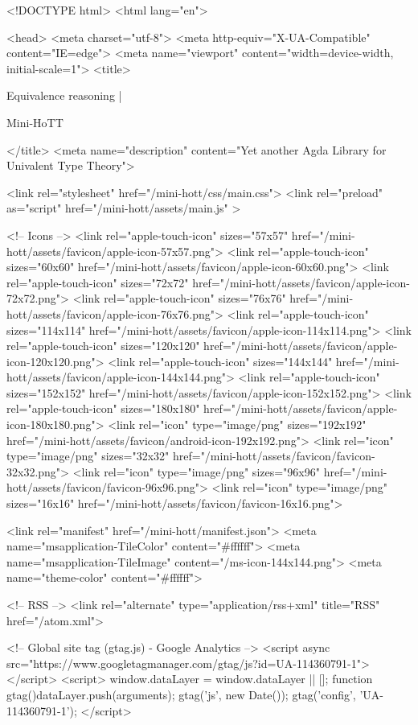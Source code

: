 <!DOCTYPE html>
<html lang="en">

<head>
  <meta charset="utf-8">
  <meta http-equiv="X-UA-Compatible" content="IE=edge">
  <meta name="viewport" content="width=device-width, initial-scale=1">
  <title>
    
      
        Equivalence reasoning |
      
        Mini-HoTT
    
  </title>
  <meta name="description" content="Yet another Agda Library for Univalent Type Theory">

  <link rel="stylesheet" href="/mini-hott/css/main.css">
  <link rel="preload" as="script" href="/mini-hott/assets/main.js" >

  <!-- Icons -->
  <link rel="apple-touch-icon" sizes="57x57" href="/mini-hott/assets/favicon/apple-icon-57x57.png">
  <link rel="apple-touch-icon" sizes="60x60" href="/mini-hott/assets/favicon/apple-icon-60x60.png">
  <link rel="apple-touch-icon" sizes="72x72" href="/mini-hott/assets/favicon/apple-icon-72x72.png">
  <link rel="apple-touch-icon" sizes="76x76" href="/mini-hott/assets/favicon/apple-icon-76x76.png">
  <link rel="apple-touch-icon" sizes="114x114" href="/mini-hott/assets/favicon/apple-icon-114x114.png">
  <link rel="apple-touch-icon" sizes="120x120" href="/mini-hott/assets/favicon/apple-icon-120x120.png">
  <link rel="apple-touch-icon" sizes="144x144" href="/mini-hott/assets/favicon/apple-icon-144x144.png">
  <link rel="apple-touch-icon" sizes="152x152" href="/mini-hott/assets/favicon/apple-icon-152x152.png">
  <link rel="apple-touch-icon" sizes="180x180" href="/mini-hott/assets/favicon/apple-icon-180x180.png">
  <link rel="icon" type="image/png" sizes="192x192"  href="/mini-hott/assets/favicon/android-icon-192x192.png">
  <link rel="icon" type="image/png" sizes="32x32" href="/mini-hott/assets/favicon/favicon-32x32.png">
  <link rel="icon" type="image/png" sizes="96x96" href="/mini-hott/assets/favicon/favicon-96x96.png">
  <link rel="icon" type="image/png" sizes="16x16" href="/mini-hott/assets/favicon/favicon-16x16.png">

  <link rel="manifest" href="/mini-hott/manifest.json">
  <meta name="msapplication-TileColor" content="#ffffff">
  <meta name="msapplication-TileImage" content="/ms-icon-144x144.png">
  <meta name="theme-color" content="#ffffff">

  <!-- RSS -->
  <link rel="alternate" type="application/rss+xml" title="RSS" href="/atom.xml">

  <!-- Global site tag (gtag.js) - Google Analytics -->
  <script async src="https://www.googletagmanager.com/gtag/js?id=UA-114360791-1"></script>
  <script>
    window.dataLayer = window.dataLayer || [];
    function gtag(){dataLayer.push(arguments);}
    gtag('js', new Date());
    gtag('config', 'UA-114360791-1');
  </script>

